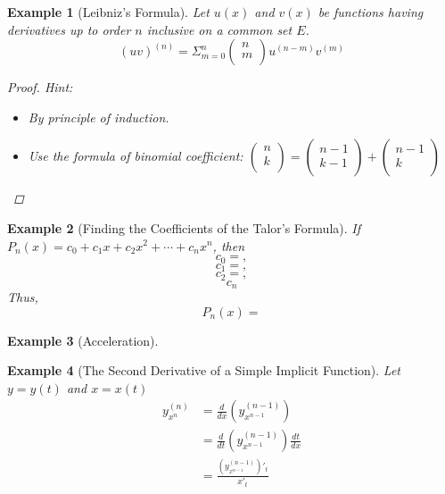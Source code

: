 \documentclass[onecolumn]{ctexart}
\newtheorem{example}{Example}
\begin{document}
\begin{example}[Leibniz's Formula]
  Let $u(x)$ and $v(x)$ be functions having derivatives up to order $n$ 
  inclusive on a common set $E$.
  \begin{equation}
    (uv)^{(n)} = \Sigma_{m=0}^n 
    \begin{pmatrix}
      n \\
      m \\
    \end{pmatrix} u^{(n-m)} v^{(m)}
  \end{equation}
  \begin{proof}
    Hint:
    \begin{itemize}
      \item By principle of induction.
      \item Use the formula of binomial coefficient: $
      \begin{pmatrix}
        n \\
        k \\
      \end{pmatrix} = 
      \begin{pmatrix}
        n-1 \\
        k-1 \\
      \end{pmatrix} + 
      \begin{pmatrix}
        n-1 \\
        k \\
      \end{pmatrix}$
    \end{itemize}
  \end{proof}
\end{example}

\begin{example}[Finding the Coefficients of the Talor's Formula]
  If $P_n(x) = c_0 + c_1 x + c_2 x^2 + \cdots + c_n x^n$, then
  \[
    c_0 = ,
  \]
  \[
    c_1 = ,
  \]
  \[
    c_2 = ,
  \]
  \[
    c_n
  \]
  Thus,
  \[
    P_n(x) = 
  \]
\end{example}

\begin{example}[Acceleration]
  
\end{example}

\begin{example}[The Second Derivative of a Simple Implicit Function]
  Let $y = y(t)$ and $x = x(t)$
  \[
    \begin{split}
      y_{x^n}^{(n)} &= \frac{d}{dx}(y_{x^{n-1}}^{(n-1)}) \\
                    &= \frac{d}{dt}(y_{x^{n-1}}^{(n-1)}) \frac{dt}{dx} \\
                    &= \frac{(y_{x^{n-1}}^{(n-1)})'_t}{x'_t}
    \end{split}
  \]
\end{example}
\end{document}

